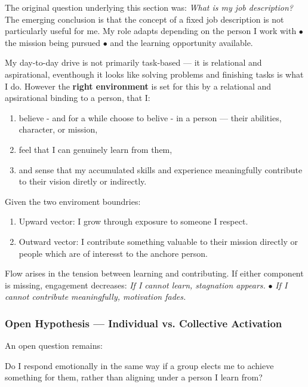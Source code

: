  The original question underlying this section was: \textit{What is my job description?}\\
 
 The emerging conclusion is that the concept of a fixed job description is not particularly useful for me. My role adapts depending on the person I work with $\bullet$ the mission being pursued $\bullet$ and the learning opportunity available.
 
 My day-to-day drive is not primarily task-based — it is relational and aspirational, eventhough it looks like solving problems and finishing tasks is what I do. However the \textbf{right environment} is set for this by a relational and apsirational binding to a person, that  I:
 \begin{enumerate}
 	\item believe - and for a while choose to belive -  in a person — their abilities, character, or mission,
 	\item feel that I can genuinely learn from them,
 	\item and sense that my accumulated skills and experience meaningfully contribute to their vision diretly or indirectly.
 \end{enumerate}
 
 Given the two enviroment boundries: 
 \begin{enumerate}
 	\item Upward vector: I grow through exposure to someone I respect.
 	\item Outward vector: I contribute something valuable to their mission directly or people which are of interesst to the anchore person.
 \end{enumerate}
 
 Flow arises in the tension between learning and contributing. If either component is missing, engagement decreases: \textit{If I cannot learn, stagnation appears.} $\bullet$ \textit{If I cannot contribute meaningfully, motivation fades.}\\
 
 \subsubsection{Open Hypothesis — Individual vs. Collective Activation}
 
 An open question remains:
 
 Do I respond emotionally in the same way if a group elects me to achieve something for them, rather than aligning under a person I learn from?
 
